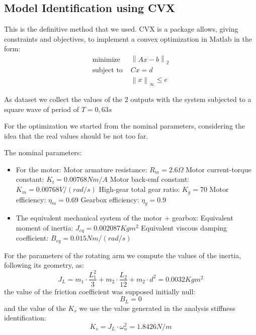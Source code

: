         \subsection{Model Identification using CVX}

            This is the definitive method that we used. CVX is a package allows, giving constraints and objectives, to implement a convex optimization in Matlab in the form:
            \begin{align*}
                \text{minimize   }  & \left\|Ax-b\right\|_{2} \\
                \text{subject to   }& Cx=d \\
                                    & \left\|x\right\|_{\infty} \leq e
            \end{align*}
                
            As dataset we collect the values of the 2 outputs with the system subjected to a square wave of period of $T = 0,63 s$ 

            For the optimization we started from the nominal parameters, considering the idea that the real values should be not too far. 
            
            The nominal parameters:

            \begin{itemize}
                \item For the motor:
                    \subitem Motor armature resistance: $R_m = 2.6 \Omega$
                    \subitem Motor current-torque constant: $K_t = 0.00768 Nm/A$
                    \subitem Motor back-emf constant: $K_m = 0.00768 V/(rad/s)$
                    \subitem High-gear total gear ratio: $K_g = 70$
                    \subitem Motor efficiency: $\eta_m = 0.69$
                    \subitem Gearbox efficiency: $\eta_g = 0.9$
                \item The equivalent mechanical system of the motor + gearbox:
                    \subitem Equivalent moment of inertia: $J_{eq} = 0.002087 Kg m^2$
                    \subitem Equivalent viscous damping coefficient: $B_{eq} = 0.015 Nm/(rad/s)$
            \end{itemize}

            For the parameters of the rotating arm we compute the values of the inertia, following its geometry, as:
                \[
                    J_L = m_1 \cdot \frac{L_1^2}{3} + m_2 \cdot \frac{L_2}{12} + m_2 \cdot d^2 = 0.0032 Kg m^2\]
            the value of the friction coefficient was supposed initially null:
                \[
                    B_L = 0\]
            and the value of the $K_s$ we use the value generated in the analysis stiffness identification:
                \[
                    K_s = J_L \cdot \omega_n^2 = 1.8426 N/m \]
            
